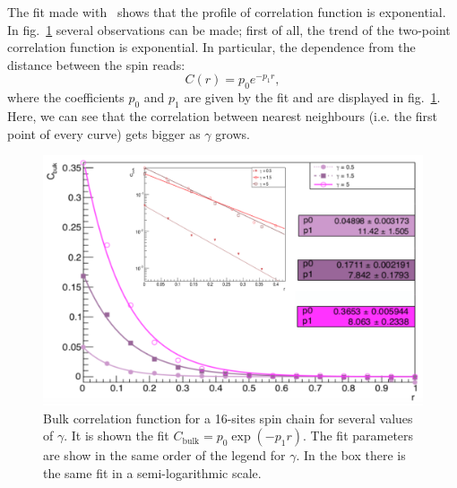 The fit made with~\cite{root_cern} shows that the profile of correlation function is exponential. In fig.~\ref{fig:16sites_FIT_CFBulkCONNvsGamma} several observations can be made; first of all, the trend of the two-point correlation function is exponential. In particular, the dependence from the distance between the spin reads:
\begin{equation*}
    C(r) = p_0 e^{-p_1 r},
\end{equation*}
where the coefficients $p_0$ and $p_1$ are given by the fit and are displayed in fig.~\ref{fig:16sites_FIT_CFBulkCONNvsGamma}. Here, we can see that the correlation between nearest neighbours (i.e. the first point of every curve) gets bigger as $\gamma$ grows.

\begin{figure}[H]
    \centering
    \includegraphics[scale=0.7]{Figures/16sites/16sites_FIT_CFBulkCONNvsGamma.png}
    \captionsetup{width=1.\linewidth}
    \caption{Bulk correlation function for a 16-sites spin chain for several values of $\gamma$. It is shown the fit $C_{\text{bulk}} = p_0 \exp{(-p_1 r)}$. The fit parameters are show in the same order of the legend for $\gamma$. In the box there is the same fit in a semi-logarithmic scale.}
    \label{fig:16sites_FIT_CFBulkCONNvsGamma}
\end{figure}


